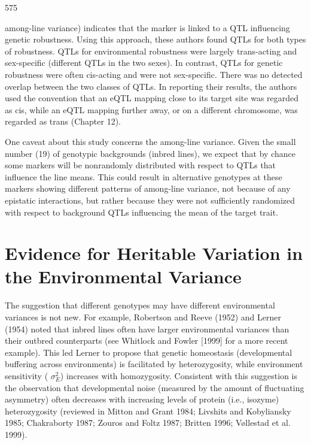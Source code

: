 \documentclass{article}
\begin{document}
575

among-line variance) indicates that the marker is linked to a QTL influencing genetic robustness. Using this approach, these authors found QTLs for both types of robustness. QTLs for environmental robustness were largely trans-acting and sex-specific (different QTLs in the two sexes). In contrast, QTLs for genetic robustness were often cis-acting and were not sex-specific. There was no detected overlap between the two classes of QTLs. In reporting their results, the authors used the convention that an eQTL mapping close to its target site was regarded as cis, while an eQTL mapping further away, or on a different chromosome, was regarded as trans (Chapter 12).

One caveat about this study concerns the among-line variance. Given the small number (19) of genotypic backgrounds (inbred lines), we expect that by chance some markers will be nonrandomly distributed with respect to QTLs that influence the line means. This could result in alternative genotypes at these markers showing different patterns of among-line variance, not because of any epistatic interactions, but rather because they were not sufficiently randomized with respect to background QTLs influencing the mean of the target trait.

\section{Evidence for Heritable Variation in the Environmental Variance}
The suggestion that different genotypes may have different environmental variances is not new. For example, Robertson and Reeve (1952) and Lerner (1954) noted that inbred lines often have larger environmental variances than their outbred counterparts (see Whitlock and Fowler [1999] for a more recent example). This led Lerner to propose that genetic homeostasis (developmental buffering across environments) is facilitated by heterozygosity, while environment sensitivity ( $ \sigma_{E}^{2} $) increases with homozygosity. Consistent with this suggestion is the observation that developmental noise (measured by the amount of fluctuating asymmetry) often decreases with increasing levels of protein (i.e., isozyme) heterozygosity (reviewed in Mitton and Grant 1984; Livshits and Kobyliansky 1985; Chakraborty 1987; Zouros and Foltz 1987; Britten 1996; Vøllestad et al. 1999).
\end{document}
